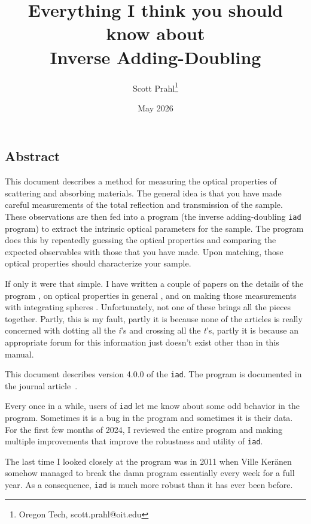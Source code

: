 \documentclass{article}
\newcommand\iadprog{\texttt{iad}}
\begin{document}
\title{Everything I think you should know about \\
Inverse Adding-Doubling}
\author{
Scott Prahl\thanks{Oregon Tech, scott.prahl@oit.edu}
}
\date{May 2026}	

\maketitle

\subsection*{Abstract}  
This document describes a method for measuring the optical properties of
scattering and absorbing materials.  The general idea is that you have made 
careful measurements of the total reflection and transmission of the sample.  
These observations are then fed into
a program (the inverse adding-doubling \iadprog{} program) to extract the intrinsic
optical parameters for the sample.   The program does this by repeatedly guessing
the optical properties and comparing the expected observables with those that you
have made.  Upon matching, those optical properties should characterize 
your sample.

If only it were that simple.  I have written a couple of papers on the details of
the program \cite{jacques87a,prahl93a,moffitt06a}, on optical properties in general
\cite{cheong90a}, and on making those measurements with integrating spheres
\cite{pickering92,pickering93a}.  Unfortunately, not one of these brings all the
pieces together.  Partly, this is my fault, partly it is because none of the
articles is really concerned with dotting all the \textit{i}'s and crossing all
the \textit{t}'s, partly it is because an appropriate forum for this information
just doesn't exist other than in this manual.

This document describes version 4.0.0 of the \iadprog{}.  The program is documented in the
journal article~\cite{moffitt07a}.

Every once in a while, users of \iadprog{} let me know about some odd behavior in 
the program.  Sometimes it is a bug in the program and sometimes it is their data.
For the first few months of 2024, I reviewed the entire program and
making multiple improvements that improve the robustness and utility of \iadprog{}.


The last time I looked closely at the program was in 2011 when Ville
Ker{\"a}nen somehow managed to break the damn program essentially every week for a
full year.  As a consequence, \iadprog{} is much more robust than it has ever been before.
\end{document}
